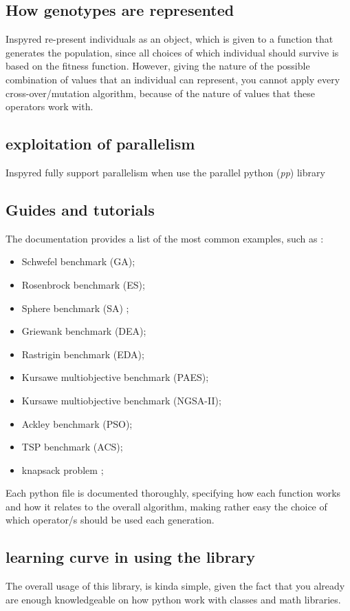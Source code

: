 \documentclass{article}
\begin{document}
	\subsection{How genotypes are represented}
	Inspyred re-present individuals as an object, which is given to a function that generates the population, since all choices of which individual should survive is based on the fitness function. 
	However, giving the nature of the possible combination of values that an individual can represent, you cannot apply every cross-over/mutation algorithm, because of the nature of values that these operators work with.
	\subsection{exploitation of parallelism}
	Inspyred fully support parallelism when use the parallel python (\textit{pp}) library
	\subsection{Guides and tutorials}
	The documentation provides a list of the most common examples, such as : 
	\begin{itemize}
		\item Schwefel benchmark (GA);
		\item Rosenbrock benchmark (ES);
		\item  Sphere benchmark (SA) ;
		\item Griewank benchmark (DEA);
		\item Rastrigin benchmark (EDA);
		\item Kursawe multiobjective benchmark (PAES);
		\item Kursawe multiobjective benchmark (NGSA-II);
		\item Ackley benchmark (PSO);
		\item TSP benchmark (ACS);
		\item knapsack problem ;
	\end{itemize}
	Each python file is documented thoroughly, specifying how each function works and how it relates to the overall algorithm, making rather easy the choice of which operator/s should be used each generation. 
	\subsection{learning curve in using the library}
	The overall usage of this library, is kinda simple, given the fact that you already are enough knowledgeable on how python work with classes and math libraries. 
\end{document}
